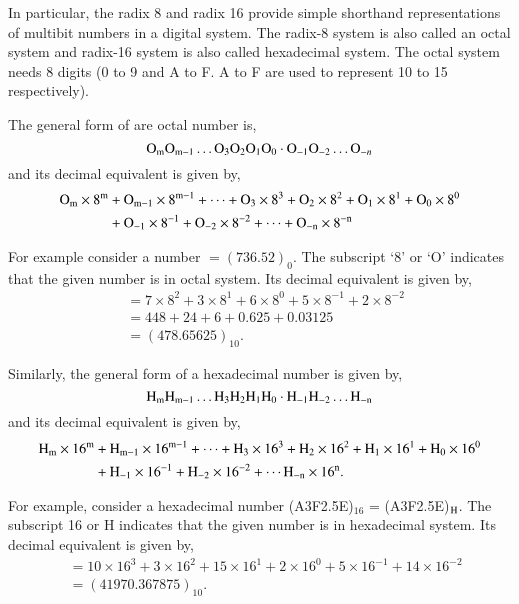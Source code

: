 In particular, the radix 8 and radix 16 provide simple shorthand representations of multibit numbers in a digital system. The radix-8 system is also called an octal system and radix-16 system is also called hexadecimal system. The octal system needs 8 digits (0 to 9 and A to F. A to F are used to represent 10 to 15 respectively).

The general form of are octal number is,
$$
\textrm{O}_{\textrm{m}}\textrm{O}_{\textrm{m}-1}\ldots \textrm{O}_{3}\textrm{O}_{2}\textrm{O}_{1}\textrm{O}_{0}\cdot \textrm{O}_{-1}\textrm{O}_{-2}\ldots \textrm{O}_{-n}
$$
and its decimal equivalent is given by,
\begin{align*}
\textrm{O}_{\textrm{m}}\times 8^{\textrm{m}} &+ \textrm{O}_{\textrm{m}-1}\times 8^{\textrm{m}-1}+\cdots+\textrm{O}_{3}\times 8^{3}+\textrm{O}_{2}\times 8^{2}+\textrm{O}_{1}\times 8^{1}+\textrm{O}_{0}\times 8^{0}\\
&+ \textrm{O}_{-1}\times 8^{-1}+\textrm{O}_{-2}\times 8^{-2}+\cdots+\textrm{O}_{-\textrm{n}}\times 8^{-\textrm{n}}
\end{align*}

For example consider a number $=(736.52)_{0}$. The subscript `8' or `O' indicates that the given number is in octal system. Its decimal equivalent is given by,
\begin{align*}
&= 7\times 8^{2}+3\times 8^{1}+6\times 8^{0}+5\times 8^{-1}+2\times 8^{-2}\\
&= 448+24+6+0.625+0.03125\\
&= (478.65625)_{10}.
\end{align*}

Similarly, the general form of a hexadecimal number is given by,
$$
\textrm{H}_{\textrm{m}}\textrm{H}_{\textrm{m}-1}\ldots \textrm{H}_{3}\textrm{H}_{2}\textrm{H}_{1}\textrm{H}_{0}\cdot \textrm{H}_{-1}\textrm{H}_{-2}\ldots \textrm{H}_{-\textrm{n}}
$$
and its decimal equivalent is given by,
\begin{align*}
\textrm{H}_{\textrm{m}}\times 16^{\textrm{m}} &+ \textrm{H}_{\textrm{m}-1}\times 16^{\textrm{m}-1}+\cdots+\textrm{H}_{3}\times 16^{3}+\textrm{H}_{2}\times 16^{2}+\textrm{H}_{1}\times 16^{1}+\textrm{H}_{0}\times 16^{0}\\
&+ \textrm{H}_{-1}\times 16^{-1}+\textrm{H}_{-2}\times 16^{-2}+\cdots \textrm{H}_{-\textrm{n}}\times 16^{\textrm{n}}.
\end{align*}

For example, consider a hexadecimal number (A3F2.5E)$_{16}$ = (A3F2.5E)$_{\textrm{H}}$. The subscript 16 or H indicates that the given number is in hexadecimal system. Its decimal equivalent is given by,
\begin{align*}
&= 10\times 16^{3}+3\times 16^{2}+15\times 16^{1}+2\times 16^{0}+5\times 16^{-1}+14\times 16^{-2}\\
&= (41970.367875)_{10}.
\end{align*}

